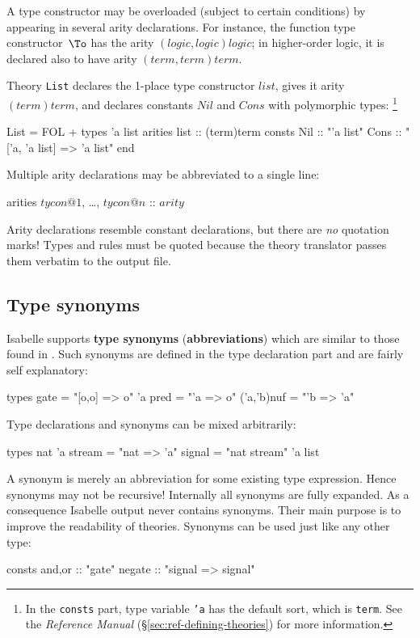 A type constructor may be overloaded (subject to certain conditions) by
appearing in several arity declarations.  For instance, the function type
constructor~$\To$ has the arity $(logic,logic)logic$; in higher-order
logic, it is declared also to have arity $(term,term)term$.

Theory {\tt List} declares the 1-place type constructor $list$, gives
it arity $(term)term$, and declares constants $Nil$ and $Cons$ with
polymorphic types:%
\footnote{In the {\tt consts} part, type variable {\tt'a} has the default
  sort, which is {\tt term}.  See the {\em Reference Manual\/}
%
{(\S\ref{sec:ref-defining-theories})} for more information.}
\begin{ttbox}
List = FOL +
types   'a list
arities list    :: (term)term
consts  Nil     :: "'a list"
        Cons    :: "['a, 'a list] => 'a list" 
end
\end{ttbox}
Multiple arity declarations may be abbreviated to a single line:
\begin{ttbox}
arities \(tycon@1\), \ldots, \(tycon@n\) :: \(arity\)
\end{ttbox}

\begin{warn}
Arity declarations resemble constant declarations, but there are {\it no\/}
quotation marks!  Types and rules must be quoted because the theory
translator passes them verbatim to the {\ML} output file.
\end{warn}

\subsection{Type synonyms}
Isabelle supports {\bf type synonyms} ({\bf abbreviations}) which are similar
to those found in \ML.  Such synonyms are defined in the type declaration part
and are fairly self explanatory:
\begin{ttbox}
types gate       = "[o,o] => o"
      'a pred    = "'a => o"
      ('a,'b)nuf = "'b => 'a"
\end{ttbox}
Type declarations and synonyms can be mixed arbitrarily:
\begin{ttbox}
types nat
      'a stream = "nat => 'a"
      signal    = "nat stream"
      'a list
\end{ttbox}
A synonym is merely an abbreviation for some existing type expression.  Hence
synonyms may not be recursive!  Internally all synonyms are fully expanded.  As
a consequence Isabelle output never contains synonyms.  Their main purpose is
to improve the readability of theories.  Synonyms can be used just like any
other type:
\begin{ttbox}
consts and,or :: "gate"
       negate :: "signal => signal"
\end{ttbox}

